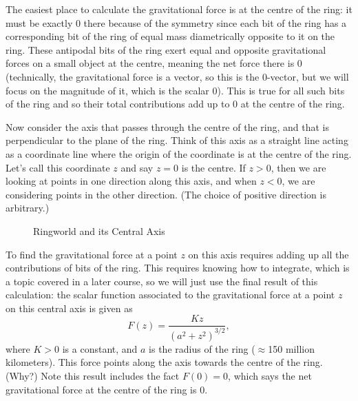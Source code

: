 \documentclass{exam}
\begin{document}
\begin{questions}
The easiest place to calculate the gravitational force is at the centre of the ring:  it must be exactly 0 there because of the symmetry since each bit of the ring has a corresponding bit of the ring of equal mass diametrically opposite to it on the ring. These antipodal bits of the ring exert equal and opposite gravitational forces on a small object at the centre, meaning the net force there is 0 (technically, the gravitational force is a vector, so this is the 0-vector, but we will focus on the magnitude of it, which is the scalar 0). This is true for all such bits of the ring and so their total contributions add up to 0 at the centre of the ring. 

Now consider the axis that passes through the centre of the ring, and that is perpendicular to the plane of the ring. Think of this axis as a straight line acting as a coordinate line where the origin of the coordinate is at the centre of the ring. Let's call this coordinate $z$ and say $z=0$ is the centre. If $z>0$, then we are looking at points in one direction along this axis, and when $z<0$, we are considering points in the other direction. (The choice of positive direction is arbitrary.) 


\begin{figure}[h]
\begin{center}
\caption{Ringworld and its Central Axis}
\end{center}
\end{figure}



To find the gravitational force at a point $z$ on this axis requires adding up all the contributions of bits of the ring. This requires knowing how to integrate, which is a topic covered in a later course, so we will just use the final result of this calculation: the scalar function associated to the gravitational force at a point $z$ on this central axis is given as $$F(z)=\frac{Kz}{(a^2+z^2)^{3/2}},$$ where $K>0$ is a constant, and $a$ is the radius of the ring ($\approx$150 million kilometers). This force points along the axis towards the centre of the ring. (Why?)  Note this result includes the fact $F(0)=0$, which says the net gravitational force at the centre of the ring is 0. 


\end{questions}
\end{document}
